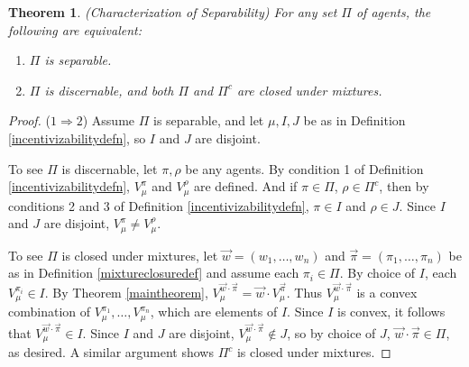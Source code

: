 \documentclass[twoside]{article}
\newtheorem{theorem}{Theorem}
\begin{document}
\begin{theorem}
\label{separabilitycharacterizationthm}
    (Characterization of Separability)
    For any set $\Pi$ of agents, the following are equivalent:
    \begin{enumerate}
        \item $\Pi$ is separable.
        \item $\Pi$ is discernable, and both $\Pi$ and $\Pi^c$ are closed under mixtures.
    \end{enumerate}
\end{theorem}

\begin{proof}
    ($1\Rightarrow 2$)
    Assume $\Pi$ is separable, and let $\mu,I,J$ be as in
    Definition \ref{incentivizabilitydefn}, so $I$ and $J$ are disjoint.

    To see $\Pi$ is discernable, let $\pi,\rho$ be any agents.
    By condition 1 of Definition \ref{incentivizabilitydefn},
    $V^\pi_\mu$ and $V^\rho_\mu$ are defined. And if $\pi\in\Pi$, $\rho\in\Pi^c$, then
    by conditions 2 and 3 of Definition \ref{incentivizabilitydefn},
    $\pi\in I$ and $\rho\in J$. Since $I$ and $J$ are disjoint,
    $V^\pi_\mu\not=V^\rho_\mu$.

    To see $\Pi$ is closed under mixtures, let $\vec w=(w_1,\ldots,w_n)$
    and $\vec\pi=(\pi_1,\ldots,\pi_n)$ be as in Definition \ref{mixtureclosuredef}
    and assume each $\pi_i\in\Pi$.
    By choice of $I$, each $V^{\pi_i}_\mu\in I$.
    By Theorem \ref{maintheorem},
    $V^{\vec w\cdot\vec\pi}_\mu=\vec w\cdot V^{\vec\pi}_\mu$.
    Thus $V^{\vec w\cdot\vec\pi}_\mu$ is a convex combination
    of $V^{\pi_1}_\mu,\ldots,V^{\pi_n}_\mu$, which are elements of $I$.
    Since $I$ is convex, it follows that $V^{\vec w\cdot\vec\pi}_\mu\in I$.
    Since $I$ and $J$ are disjoint, $V^{\vec w\cdot\vec\pi}_\mu\not\in J$,
    so by choice of $J$, $\vec w\cdot\vec\pi\in\Pi$, as desired.
    A similar argument shows $\Pi^c$ is closed under mixtures.


\end{proof}
\end{document}

